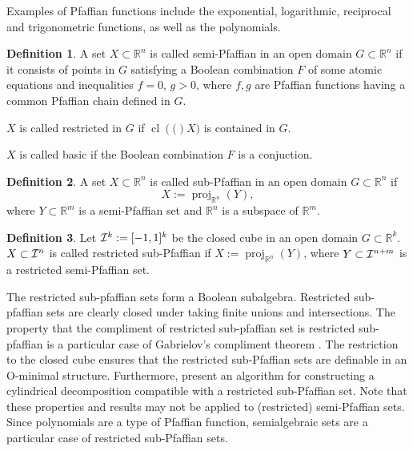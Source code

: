 \documentclass[
]{book}
\theoremstyle{definition}
\newtheorem{definition}{Definition}[chapter]
\theoremstyle{definition}
\theoremstyle{definition}
\theoremstyle{definition}
\theoremstyle{remark}
\begin{document}
Examples of Pfaffian functions include the exponential, logarithmic, reciprocal and trigonometric functions, as well as the polynomials.

\begin{definition}
\citep[Definition 2.7]{gv04}
A set \(X \subset \mathbb{R}^n\) is called semi-Pfaffian in an open domain
\(G \subset \mathbb{R}^n\) if it consists of points in \(G\) satisfying a Boolean combination \(F\) of some atomic equations and inequalities \(f = 0\), \(g > 0\), where \(f, g\) are Pfaffian functions having a common Pfaffian chain defined in \(G\).

\(X\) is called restricted in \(G\) if \({\operatorname{cl} \left( ( \right)}X)\) is contained in \(G\).

\(X\) is called basic if the Boolean combination \(F\) is a conjuction.
\end{definition}

\begin{definition}
\citep[Definition 2.8]{gv04}
A set \(X \subset \mathbb{R}^n\) is called sub-Pfaffian in an open domain \(G \subset \mathbb{R}^n\) if
\[
X := {\operatorname{proj}_{\mathbb{R}^{n}}}(Y),
\]
where \(Y \subset \mathbb{R}^m\) is a semi-Pfaffian set and \(\mathbb{R}^n\) is a subspace of \(\mathbb{R}^m\).
\end{definition}

\begin{definition}
\citep[2.9]{gv04}
Let \({\cal I}^k := [-1,1]^k\) be the closed cube in an open domain \(G \subset \mathbb{R}^k\).
\(X \subset {\cal I}^n\) is called restricted sub-Pfaffian if \(X := {\operatorname{proj}_{\mathbb{R}^{n}}}(Y)\), where \(Y \subset {\cal I}^{n+m}\) is a restricted semi-Pfaffian set.
\end{definition}

The restricted sub-pfaffian sets form a Boolean subalgebra. Restricted sub-pfaffian sets are clearly closed under taking finite unions and intersections. The property that the compliment of restricted sub-pfaffian set is restricted sub-pfaffian is a particular case of Gabrielov's compliment theorem \citep{gabrielov1996}. The restriction to the closed cube ensures that the restricted sub-Pfaffian sets are definable in an O-minimal structure. Furthermore, \citet{gv01} present an algorithm for constructing a cylindrical decomposition compatible with a restricted sub-Pfaffian set. Note that these properties and results may not be applied to (restricted) semi-Pfaffian sets. Since polynomials are a type of Pfaffian function, semialgebraic sets are a particular case of restricted sub-Pfaffian sets.
\end{document}
